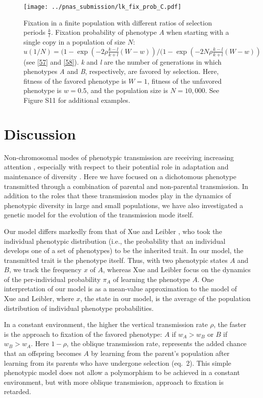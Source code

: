 \documentclass[9pt,twocolumn,twoside,lineno]{pnas-new}
\begin{document}
\begin{figure}[h]
\centering
\texttt{[image: ../pnas\_submission/lk\_fix\_prob\_C.pdf]}
\caption{Fixation in a finite population with different ratios of selection periods \(\frac{k}{l}\). Fixation probability of phenotype $A$ when starting with a single copy in a population of size $N$: $u(1/N) = (1-\exp(-2 \rho \frac{k-l}{k+l}(W-w))/(1-\exp(-2 N \rho \frac{k-l}{k+l}(W-w))$ (see \eqref{57} and \eqref{58}).
\emph{k} and \emph{l} are the number of
generations in which phenotypes \emph{A} and \emph{B}, respectively, are favored by
selection. Here, fitness of the favored phenotype is $W = 1$, fitness of the unfavored phenotype is $w=0.5$, and the population size is \(N=10,000\). 
See Figure S11 for additional examples.} \label{lk_fix_prob_C}
\end{figure}

 
 \section*{Discussion}

Non-chromosomal modes of phenotypic transmission are receiving increasing attention \cite{whiten2017extension,jaenisch2003epigenetic,allis2016molecular}, especially with respect to their potential role in adaptation and maintenance of diversity \cite{rivoire2014model}. Here we have focused on a dichotomous phenotype transmitted through a combination of parental and non-parental transmission. In addition to the roles that these transmission modes play in the dynamics of phenotypic diversity in large and small populations, we have also investigated a genetic model for the evolution of the transmission mode itself.

Our model differs markedly from that of Xue and Leibler \cite{xue2016evolutionary}, who took the individual phenotypic distribution (i.e., the probability that an individual develops one of a set of phenotypes) to be the inherited trait. In our model, the transmitted trait is the phenotype itself. Thus, with two phenotypic states $A$ and $B$, we track the frequency $x$ of $A$, whereas Xue and Leibler focus on the dynamics of the per-individual probability $\pi_A$ of learning the phenotype $A$. One interpretation of our model is as a mean-value approximation to the model of Xue and Leibler, where $x$, the state in our model, is the average of the population distribution of individual phenotype probabilities. 

In a constant environment, the higher the vertical transmission rate $\rho$, the faster is the approach to fixation of the favored phenotype: $A$ if $w_A>w_B$ or $B$ if $w_B>w_A$. Here $1-\rho$, the oblique transmission rate, represents the added chance that an offspring becomes $A$ by learning from the parent's population after learning from its parents who have undergone selection (eq.\ 2). This simple phenotypic model does not allow a polymorphism to be achieved in a constant environment, but with more oblique transmission, approach to fixation is retarded.
\end{document}
